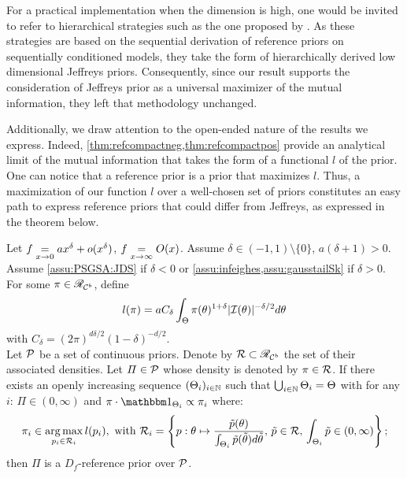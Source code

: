 For a practical implementation when the dimension is high, one would be invited to refer to hierarchical strategies such as the one proposed by \citet{berger_overall_2015}. 
As these strategies are based on the sequential derivation of reference priors on sequentially conditioned models, they take the form of hierarchically derived low dimensional Jeffreys priors. Consequently, 
since our result supports the consideration of Jeffreys prior as a universal maximizer of the mutual information, they left that methodology unchanged.

Additionally, we draw attention to the open-ended nature of the results we express. 
Indeed, \cref{thm:refcompactneg,thm:refcompactpos} provide an analytical limit of the mutual information that takes the form of a functional $l$ of the prior.
One can notice that a reference prior is a prior that maximizes $l$.
Thus, a maximization of our function $l$ over a well-chosen set of priors constitutes an easy path to express reference priors that could differ from Jeffreys, as expressed in the theorem below.
\begin{thm}\label{thm:PSGSA:maximizel}
    Let $f\overset{}{\underset{x\rightarrow 0}{=}} a x^\delta+o(x^\delta)$, $f\overset{}{\underset{x\rightarrow\infty}{=}}O(x)$. Assume $\delta\in(-1,1)\!\setminus\{0\}$, $a(\delta+1)>0$. Assume \cref{assu:PSGSA:JDS} if $\delta<0$ or \cref{assu:infeighes,assu:gausstailSk} if $\delta>0$.
    For some $\pi\in\mathscr{R}_{\mathcal{C}^b}$, define
        \begin{equation}
            l(\pi) = aC_\delta\int_\Theta\pi(\theta)^{1+\delta}|\mathcal{I}(\theta)|^{-\delta/2}d\theta
        \end{equation}
    with $C_\delta=(2\pi)^{d\delta/2}(1-\delta)^{-d/2} $. \\
    Let $\mathcal{P}$ be a set of continuous priors. %
    Denote by $\mathcal{R}\subset\mathscr{R}_{\mathcal{C}^b}$ the set of their associated densities.
    Let $\varPi\in\mathcal{P}$ whose density is denoted by $\pi\in\mathcal{R}$.
    If there exists an openly increasing sequence $(\Theta_i)_{i\in\mathbb{N}}$ such that $\bigcup_{i\in\mathbb{N}}\Theta_i=\Theta$ with for any $i$: $\varPi\in(0,\infty)$ and $\pi\cdot\indic_{\Theta_i}\propto\pi_i$ where:
        \begin{equation}\label{eq:PSGSA:piiargmaxl}
            \pi_i\in \argmax_{p_i\in\cR_i} l(p_i) ,\text{\ with\ }\cR_i=\left\{p:\theta\mapsto\frac{\tilde p(\theta)}{\int_{\Theta_i}\tilde p(\tilde\theta)d\tilde\theta },\,   \tilde p\in\cR,\, \int_{\Theta_i}\tilde p\in(0,\infty)    \right\};
        \end{equation}
    then $\varPi$ is a $D_f$-reference prior over $\mathcal{P}$.
\end{thm}

